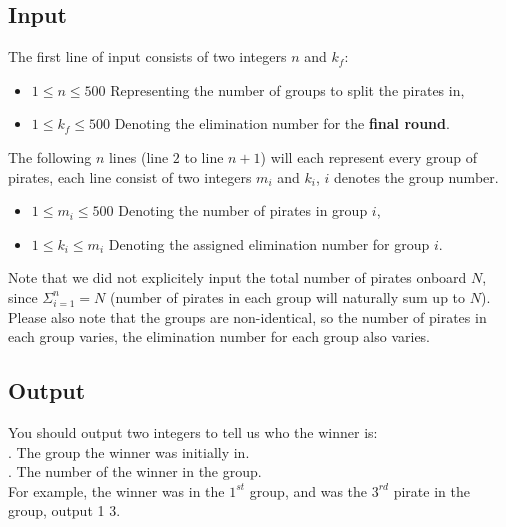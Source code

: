 \documentclass[12pt,a4paper]{article}
\begin{document}
\subsection*{\fontsize{16}{12}Input}
The first line of input consists of two integers \(n\) and \(k_f\):\\
\begin{itemize}
    \item \(1 \leq n \leq 500\) Representing the number of groups to split the pirates in,
    \item \(1 \leq k_f \leq 500\) Denoting the elimination number for the \textbf{final round}.
\end{itemize}
The following \(n\) lines (line \(2\) to line \(n + 1\)) will each represent every group of pirates, each line consist of two integers \(m_i\) and \(k_i\), \(i\) denotes the group number.\\
\indent
\begin{itemize}
    \item \(1 \leq m_i \leq 500\) Denoting the number of pirates in group \(i\),
    \item \(1 \leq k_i \leq m_i\) Denoting the assigned elimination number for group \(i\).
\end{itemize}
\noindent
Note that we did not explicitely input the total number of pirates onboard \(N\), since 
\(\Sigma_{i=1}^n=N\) (number of pirates in each group will naturally sum up to \(N\)).\\

\noindent
Please also note that the groups are non-identical, so the number of pirates in each group varies, 
the elimination number for each group also varies.\\


\subsection*{\fontsize{16}{12}Output}
You should output two integers to tell us who the winner is:\\
. The group the winner was initially in.\\
. The number of the winner in the group.\\

\noindent
For example, the winner was in the $1^{st}$ group, and was the $3^{rd}$ pirate in the group, output 1 3. 
\end{document}
